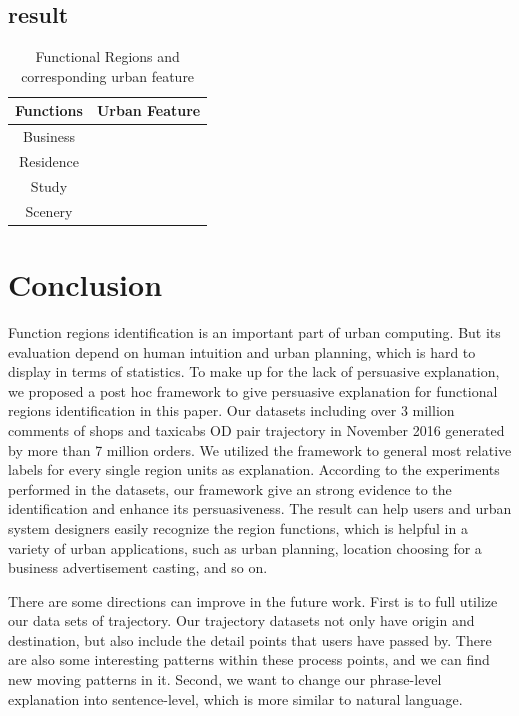 \documentclass[runningheads]{llncs}
\begin{document}
\subsection{result}
\begin{table}[h]
\centering
\caption{Functional Regions and corresponding urban feature}\label{dataset}
\begin{tabular}{c|c}
\hline
Functions & Urban Feature\\
\hline
Business & \\
\hline
Residence & \\
\hline
Study & \\
\hline
Scenery & \\
\hline
\end{tabular}
\end{table}

\section{Conclusion}\label{sec:conclusions}
Function regions identification is an important part of urban computing.
But its evaluation depend on human intuition and urban planning, which is hard to display in terms of statistics.
To make up for the lack of persuasive explanation, we proposed a post hoc framework to give persuasive explanation for functional regions identification in this paper.
Our datasets including over 3 million comments of shops and taxicabs OD pair trajectory in November 2016 generated by more than 7 million orders.
We utilized the framework to general most relative labels for every single region units as explanation.
According to the experiments performed in the datasets, our framework give an strong evidence to the identification and enhance its persuasiveness.
The result can help users and urban system designers easily recognize the region functions, which is helpful in a variety of urban applications, such as urban planning, location choosing for a business advertisement casting, and so on.

There are some directions can improve in the future work.
First is to full utilize our data sets of trajectory. 
Our trajectory datasets not only have origin and destination, but also include the detail points that users have passed by.
There are also some interesting patterns within these process points, and we can find new moving patterns in it. 
Second, we want to change our phrase-level explanation into sentence-level, which is more similar to natural language.
\end{document}
